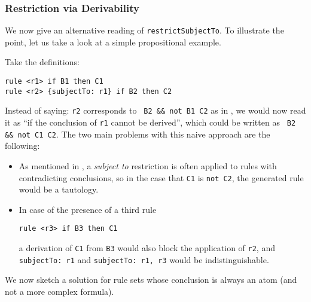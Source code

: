 \subsubsection{Restriction via Derivability}\label{sec:restr_deriv}

We now give an alternative reading of \texttt{restrictSubjectTo}. To
illustrate the point, let us take a look at a simple propositional example.

\begin{example}\label{ex:small_propositional} Take the definitions:
\begin{lstlisting}
rule <r1> if B1 then C1
rule <r2> {subjectTo: r1} if B2 then C2
\end{lstlisting}
\end{example}

Instead of saying: \texttt{r2} corresponds to
\texttt{ B2 \&\& not B1  C2} 
as in , we would now read it as
``if the conclusion of \texttt{r1} cannot be derived'', 
which could be written as
\texttt{ B2 \&\& not C1  C2}.
The two main problems with this naive approach are the following:
\begin{itemize}
\item As mentioned in , a \emph{subject to}
  restriction is often applied to rules with contradicting conclusions, so in
  the case that \texttt{C1} is \texttt{not C2}, the generated rule would be a
  tautology.
\item In case of the presence of a third rule
\begin{lstlisting}[frame=none]
rule <r3> if B3 then C1
\end{lstlisting}
a derivation of \texttt{C1} from \texttt{B3} would also block the application
of \texttt{r2}, and \texttt{subjectTo: r1} and \texttt{subjectTo: r1, r3}
would be indistinguishable.
\end{itemize}

We now sketch a solution for rule sets whose conclusion is always an atom (and
not a more complex formula).

